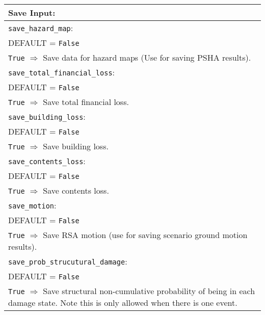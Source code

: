 \vspace{2em}
\begin{tabular}{|p{\textwidth}|}
\hline
\vspace{0.3em} \noindent \Large \textbf{Save Input:} \normalsize \\
\hline \vspace{0.1em} \texttt{save\_hazard\_map}: \\
DEFAULT = \texttt{False} \\
\texttt{True} $\Rightarrow$ Save data for hazard maps (Use for saving PSHA results). \\
\hline \vspace{0.1em} \texttt{save\_total\_financial\_loss}: \\
DEFAULT = \texttt{False} \\
\texttt{True} $\Rightarrow$ Save total financial loss. \\
 \hline
\vspace{0.1em} \texttt{save\_building\_loss}: \\
DEFAULT = \texttt{False} \\
\texttt{True} $\Rightarrow$ Save building loss. \\
 \hline
\vspace{0.1em} \texttt{save\_contents\_loss}: \\
DEFAULT = \texttt{False} \\
 \texttt{True} $\Rightarrow$ Save contents loss. \\
\hline \vspace{0.1em} \texttt{save\_motion}: \\
DEFAULT = \texttt{False} \\
\texttt{True} $\Rightarrow$ Save RSA motion (use for saving scenario ground motion results). \\
\hline \vspace{0.1em} \texttt{save\_prob\_strucutural\_damage}: \\
DEFAULT = \texttt{False} \\
\texttt{True} $\Rightarrow$ Save structural non-cumulative
probability of being in each
damage state.  Note this is only allowed when there is one event. \\
\hline
 \end{tabular}
